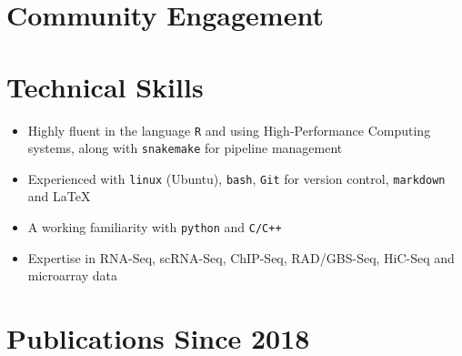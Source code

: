 \documentclass[11pt,a4paper,]{moderncv}
\providecommand{\tightlist}{%
	\setlength{\itemsep}{0pt}\setlength{\parskip}{0pt}}
\begin{document}
\hypertarget{community-engagement}{%
\section{Community Engagement}\label{community-engagement}}

\nopagebreak

\hypertarget{technical-skills}{%
\section{Technical Skills}\label{technical-skills}}

\begin{itemize}
\tightlist
\item
  Highly fluent in the language \texttt{R} and using High-Performance
  Computing systems, along with \texttt{snakemake} for pipeline
  management
\item
  Experienced with \texttt{linux} (Ubuntu), \texttt{bash}, \texttt{Git}
  for version control, \texttt{markdown} and \LaTeX
\item
  A working familiarity with \texttt{python} and \texttt{C/C++}
\item
  Expertise in RNA-Seq, scRNA-Seq, ChIP-Seq, RAD/GBS-Seq, HiC-Seq and
  microarray data
\end{itemize}

\hypertarget{publications-since-2018}{%
\section{Publications Since 2018}\label{publications-since-2018}}
\end{document}
